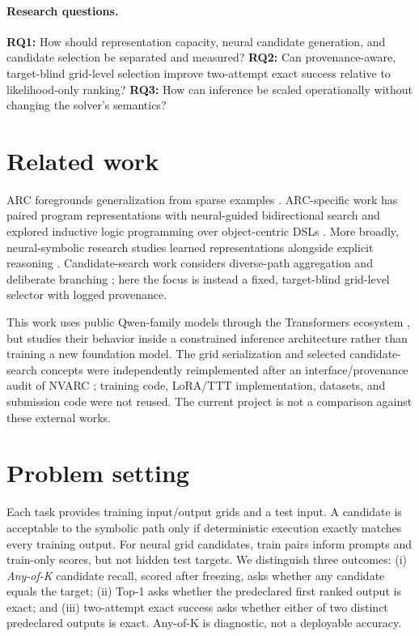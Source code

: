 \documentclass[10pt]{article}
\begin{document}
\paragraph{Research questions.} \textbf{RQ1:} How should representation capacity, neural candidate generation, and candidate selection be separated and measured? \textbf{RQ2:} Can provenance-aware, target-blind grid-level selection improve two-attempt exact success relative to likelihood-only ranking? \textbf{RQ3:} How can inference be scaled operationally without changing the solver's semantics?

\section{Related work}
ARC foregrounds generalization from sparse examples \cite{chollet2019measure}. ARC-specific work has paired program representations with neural-guided bidirectional search \cite{alford2021neuralguided} and explored inductive logic programming over object-centric DSLs \cite{rocha2024ilp}. More broadly, neural-symbolic research studies learned representations alongside explicit reasoning \cite{garcez2015neurosymbolic}. Candidate-search work considers diverse-path aggregation \cite{wang2023selfconsistency} and deliberate branching \cite{yao2023treeofthoughts}; here the focus is instead a fixed, target-blind grid-level selector with logged provenance.

This work uses public Qwen-family models \cite{qwen3} through the Transformers ecosystem \cite{wolf2020transformers}, but studies their behavior inside a constrained inference architecture rather than training a new foundation model. The grid serialization and selected candidate-search concepts were independently reimplemented after an interface/provenance audit of NVARC \cite{nvarc}; training code, LoRA/TTT implementation, datasets, and submission code were not reused. The current project is not a comparison against these external works.

\section{Problem setting}
Each task provides training input/output grids and a test input. A candidate is acceptable to the symbolic path only if deterministic execution exactly matches every training output. For neural grid candidates, train pairs inform prompts and train-only scores, but not hidden test targets. We distinguish three outcomes: (i) \emph{Any-of-K} candidate recall, scored after freezing, asks whether any candidate equals the target; (ii) Top-1 asks whether the predeclared first ranked output is exact; and (iii) two-attempt exact success asks whether either of two distinct predeclared outputs is exact. Any-of-K is diagnostic, not a deployable accuracy.
\end{document}
